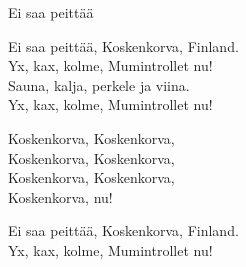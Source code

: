 \begin{song}{Ei saa peittää}
	
	
	
	Ei saa peittää, Koskenkorva, Finland.\\
	Yx, kax, kolme, Mumintrollet nu!\\
	Sauna, kalja, perkele ja viina.\\
	Yx, kax, kolme, Mumintrollet nu!
	
	Koskenkorva, Koskenkorva,\\
	Koskenkorva, Koskenkorva,\\
	Koskenkorva, Koskenkorva,\\
	Koskenkorva, nu!
		
	Ei saa peittää, Koskenkorva, Finland.\\
	Yx, kax, kolme, Mumintrollet nu!
	
\end{song}
